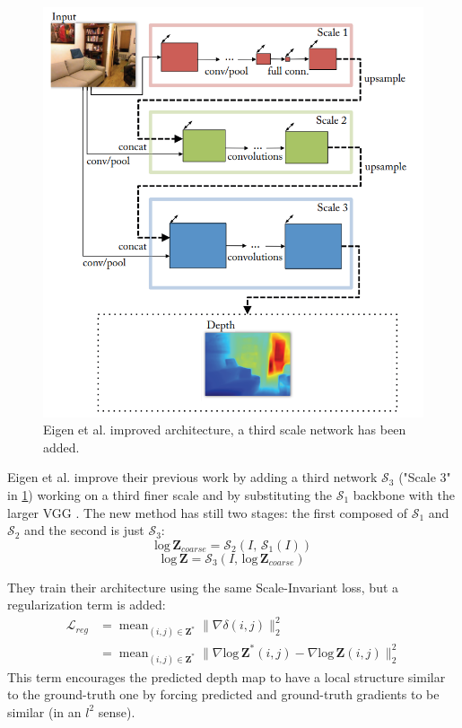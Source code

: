 \begin{figure}
\centering
\includegraphics[scale=0.6]{figs/Eigen2}
\caption{Eigen et al. \cite{Eigen2} improved architecture, a third scale network has been added.}
\label{fig:Eigen2}
\end{figure}

Eigen et al. \cite{Eigen2} improve their previous work \cite{Eigen} by adding a third network $\mathcal{S}_{3}$ ("Scale 3" in \ref{fig:Eigen2}) working on a third finer scale and by substituting the $\mathcal{S}_{1}$ backbone with the larger VGG \cite{VGG}.
The new method has still two stages: the first composed of $\mathcal{S}_{1}$ and $\mathcal{S}_{2}$ and the second is just $\mathcal{S}_{3}$:
\[
	\text{log} \, \mathbf{Z}_{coarse} = \mathcal{S}_{2}(I, \, \mathcal{S}_{1}(I))
\]\[
	\text{log} \, \mathbf{Z} = \mathcal{S}_{3}(I, \, \text{log} \, \mathbf{Z}_{coarse})
\]

They train their architecture using the same Scale-Invariant loss, but a regularization term is added:
\begin{equation}
\begin{split}
	\mathcal{L}_{reg} & = \mathop{\text{mean}}_{(i, j) \in \mathbf{Z}^{*}}
		\big\|
			\nabla \delta(i, j)
		\big\|_{2}^{2} \\
	& = \mathop{\text{mean}}_{(i, j) \in \mathbf{Z}^{*}}
		\big\|
			\nabla \text{log} \, \mathbf{Z}^{*} (i, j) - \nabla \text{log} \, \mathbf{Z} (i, j)
		\big\|_{2}^{2}
\end{split}
\end{equation}
This term encourages the predicted depth map to have a local structure similar to the ground-truth one by forcing predicted and ground-truth gradients to be similar (in an $l^{2}$ sense).

